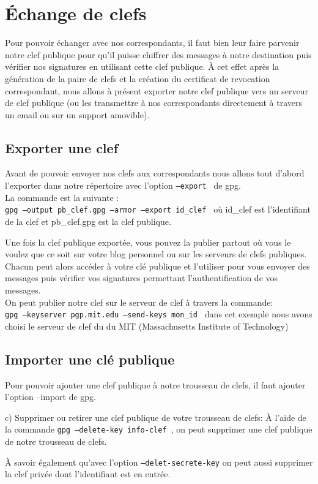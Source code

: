 \section{Échange de clefs}

Pour pouvoir échanger avec nos correspondants, il faut bien leur faire parvenir notre clef publique pour qu'il puisse chiffrer des
messages à notre destination puis vérifier nos signatures en utilisant cette clef publique. À cet effet après la génération de la 
paire de clefs et la création du certificat de revocation correspondant, nous allons à présent exporter notre clef publique vers un 
serveur de clef publique (ou les transmettre à nos correspondants directement à travers un email ou sur un support amovible).

\subsection{Exporter une clef}
Avant de pouvoir envoyer nos clefs aux correspondants nous allons tout d'abord l'exporter dans notre répertoire avec l'option
 \texttt{--export } de gpg.\\
La commande est la suivante : \\


\texttt{gpg --output pb\_clef.gpg --armor --export id\_clef } où id\_clef est l'identifiant de la clef et pb\_clef.gpg est la clef 
publique. 

Une fois la clef publique exportée, vous pouvez la publier partout où vous le voulez que ce soit sur votre blog personnel ou sur les
serveurs de clefs publiques. Chacun peut alors accéder à votre clé publique et l'utiliser pour vous envoyer des messages puis vérifier 
vos signatures permettant l'authentification de vos messages.\\

On peut publier notre clef sur le serveur de clef à travers la commande:\\

\texttt{gpg --keyserver pgp.mit.edu --send-keys  mon\_id } dans cet exemple nous avons choisi le serveur de clef du du MIT
  (Massachusetts Institute of Technology)
\subsection{Importer une clé publique}


Pour pouvoir ajouter une clef publique à notre trousseau de clefs, il faut ajouter l'option --import  de gpg.


c) Supprimer ou retirer une clef publique de votre trousseau de clefs:
À l'aide de la commande \texttt{gpg --delete-key info-clef }, on peut supprimer une clef publique de notre trousseau de clefs.

À savoir également qu'avec l'option \texttt{--delet-secrete-key} on peut aussi supprimer la clef privée dont l'identifiant est en entrée.


